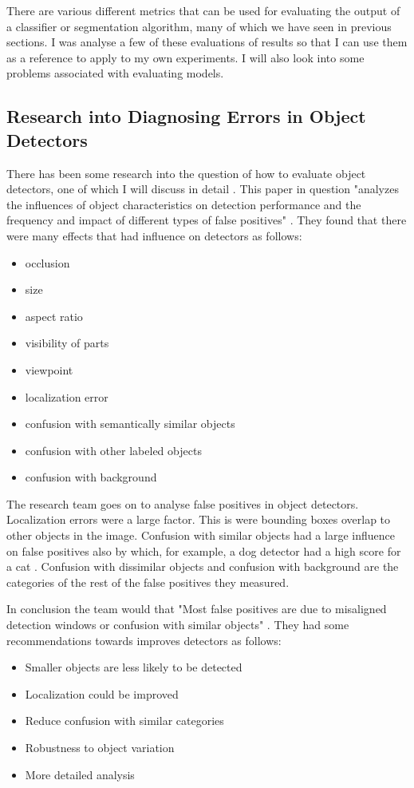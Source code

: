 There are various different metrics that can be used for evaluating the output
of a classifier or segmentation algorithm, many of which we have seen in previous
sections. I was analyse a few of these evaluations of results so that I can use
them as a reference to apply to my own experiments. I will also look into some
problems associated with evaluating models.

\subsection*{Research into Diagnosing Errors in Object Detectors}
There has been some research into the question of how to evaluate object
detectors, one of which I will discuss in detail \textcite{diagnosingErrors}.
This paper in question "analyzes the influences of object characteristics on
detection performance and the frequency and impact of different types of false
positives" \textcite{diagnosingErrors}. They found that there were many effects
that had influence on detectors as follows:
\begin{itemize}
    \item{occlusion}
    \item{size}
    \item{aspect ratio}
    \item{visibility of parts}
    \item{viewpoint}
    \item{localization error}
    \item{confusion with semantically similar objects}
    \item{confusion with other labeled objects}
    \item{confusion with background}
\end{itemize}

The research team goes on to analyse false positives in object detectors.
Localization errors were a large factor. This is were bounding boxes overlap to
other objects in the image. Confusion with similar objects had a large influence
on false positives also by which, for example, a dog detector had a high score
for a cat \textcite{diagnosingErrors}. Confusion with dissimilar objects and
confusion with background are the categories of the rest of the false positives
they measured.

In conclusion the team would that "Most false positives are due to misaligned
detection windows or confusion with similar objects"
\textcite{diagnosingErrors}. They had some recommendations towards improves
detectors as follows:
\begin{itemize}
	\item{Smaller objects are less likely to be detected}
	\item{Localization could be improved}
	\item{Reduce confusion with similar categories}
	\item{Robustness to object variation}
	\item{More detailed analysis}
\end{itemize}

